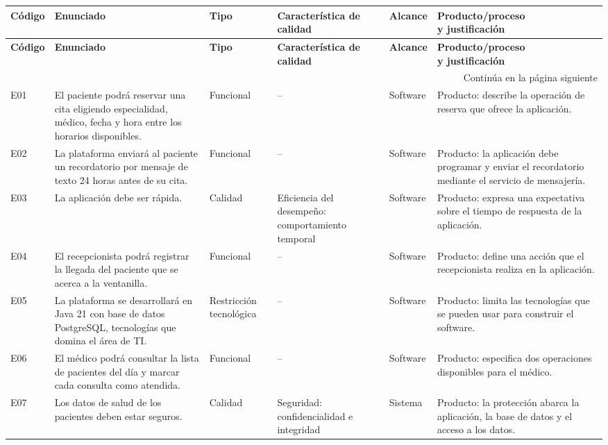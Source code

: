 \documentclass[10pt,letterpaper,landscape]{article}
\begin{document}
\small
\begin{longtable}{@{}p{0.48in}p{2.25in}p{1.35in}p{1.48in}p{1.00in}p{2.95in}@{}}
\toprule
\rowcolor{azulclaro}
\textbf{Código} & \textbf{Enunciado} & \textbf{Tipo} & \shortstack{\textbf{Característica de}\\\textbf{calidad}} & \textbf{Alcance} & \shortstack{\textbf{Producto/proceso}\\\textbf{y justificación}} \\
\midrule
\endfirsthead
\toprule
\rowcolor{azulclaro}
\textbf{Código} & \textbf{Enunciado} & \textbf{Tipo} & \shortstack{\textbf{Característica de}\\\textbf{calidad}} & \textbf{Alcance} & \shortstack{\textbf{Producto/proceso}\\\textbf{y justificación}} \\
\midrule
\endhead
\midrule
\multicolumn{6}{r}{\small Continúa en la página siguiente}\\
\endfoot
\bottomrule
\endlastfoot
E01 & El paciente podrá reservar una cita eligiendo especialidad, médico, fecha y hora entre los horarios disponibles. & Funcional & -- & Software & Producto: describe la operación de reserva que ofrece la aplicación. \\
E02 & La plataforma enviará al paciente un recordatorio por mensaje de texto 24 horas antes de su cita. & Funcional & -- & Software & Producto: la aplicación debe programar y enviar el recordatorio mediante el servicio de mensajería. \\
E03 & La aplicación debe ser rápida. & Calidad & Eficiencia del desempeño: comportamiento temporal & Software & Producto: expresa una expectativa sobre el tiempo de respuesta de la aplicación. \\
E04 & El recepcionista podrá registrar la llegada del paciente que se acerca a la ventanilla. & Funcional & -- & Software & Producto: define una acción que el recepcionista realiza en la aplicación. \\
E05 & La plataforma se desarrollará en Java 21 con base de datos PostgreSQL, tecnologías que domina el área de TI. & Restricción tecnológica & -- & Software & Producto: limita las tecnologías que se pueden usar para construir el software. \\
E06 & El médico podrá consultar la lista de pacientes del día y marcar cada consulta como atendida. & Funcional & -- & Software & Producto: especifica dos operaciones disponibles para el médico. \\
E07 & Los datos de salud de los pacientes deben estar seguros. & Calidad & Seguridad: confidencialidad e integridad & Sistema & Producto: la protección abarca la aplicación, la base de datos y el acceso a los datos. \\

\end{longtable}
\end{document}
